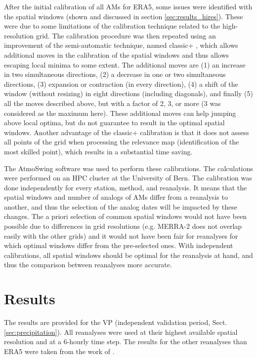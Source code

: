 \documentclass[alpha-refs]{wiley-article}
\begin{document}
After the initial calibration of all AMs for ERA5, some issues were identified with the spatial windows (shown and discussed in section \ref{sec:results_hires}). These were due to some limitations of the calibration technique related to the high-resolution grid. The calibration procedure was then repeated using an improvement of the semi-automatic technique, named classic+ \citep{Horton2019}, which allows additional moves in the calibration of the spatial windows and thus allows escaping local minima to some extent. The additional moves are (1) an increase in two simultaneous directions, (2) a decrease in one or two simultaneous directions, (3) expansion or contraction (in every direction), (4) a shift of the window (without resizing) in eight directions (including diagonals), and finally (5) all the moves described above, but with a factor of 2, 3, or more (3 was considered as the maximum here). These additional moves can help jumping above local optima, but do not guarantee to result in the optimal spatial windows. Another advantage of the classic+ calibration is that it does not assess all points of the grid when processing the relevance map (identification of the most skilled point), which results in a substantial time saving.

The AtmoSwing software \citep{Horton2019} was used to perform these calibrations. The calculations were performed on an HPC cluster at the University of Bern. The calibration was done independently for every station, method, and reanalysis. It means that the spatial windows and number of analogs of AMs differ from a reanalysis to another, and thus the selection of the analog dates will be impacted by these changes. The a priori selection of common spatial windows would not have been possible due to differences in grid resolutions (e.g. MERRA-2 does not overlap easily with the other grids) and it would not have been fair for reanalyses for which optimal windows differ from the pre-selected ones. With independent calibrations, all spatial windows should be optimal for the reanalysis at hand, and thus the comparison between reanalyses more accurate.


\section{Results}
\label{sec:results}

The results are provided for the VP (independent validation period, Sect. \ref{sec:precipitation}). All reanalyses were used at their highest available spatial resolution and at a 6-hourly time step. The results for the other reanalyses than ERA5 were taken from the work of \citet{Horton2018b}.
\end{document}
